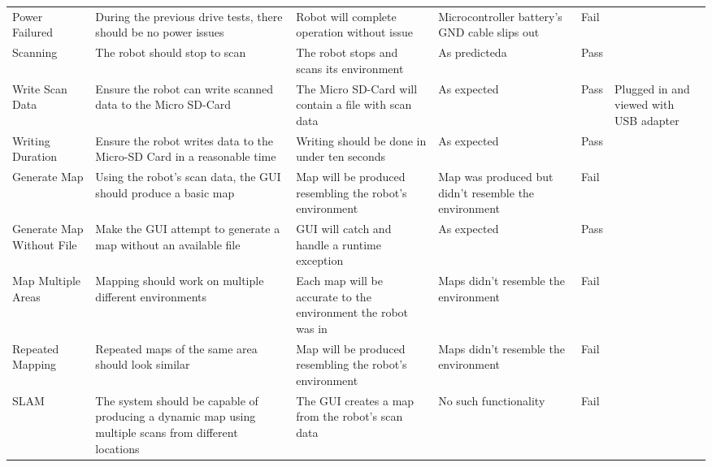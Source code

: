 \begin{appendices}
\begin{landscape}
\begin{longtable}{| p{2.5cm} | p{5cm} | p{4cm} | p{4cm} | p{1.5cm} | p{2cm} |}
						Power Failured & During the previous drive tests, there should be no power issues & Robot will complete operation without issue & Microcontroller battery's GND cable slips out & Fail &   \\
							
						Scanning & The robot should stop to scan & The robot stops and scans its environment & As predicteda & Pass &   \\ 
							
						Write Scan Data & Ensure the robot can write scanned data to the Micro SD-Card & The Micro SD-Card will contain a file with scan data & As expected & Pass & Plugged in and viewed with USB adapter  \\
							 
						Writing Duration & Ensure the robot writes data to the Micro-SD Card in a reasonable time  & Writing should be done in under ten seconds & As expected & Pass &   \\ 
							
						Generate Map & Using the robot's scan data, the GUI should produce a basic map & Map will be produced resembling the robot's environment & Map was produced but didn't resemble the environment & Fail &  \\ 
							
						Generate Map Without File & Make the GUI attempt to generate a map without an available file & GUI will catch and handle a runtime exception & As expected & Pass &  \\ 
							
						Map Multiple Areas & Mapping should work on multiple different environments & Each map will be accurate to the environment the robot was in & Maps didn't resemble the environment & Fail &  \\ 
							
						Repeated Mapping & Repeated maps of the same area should look similar & Map will be produced resembling the robot's environment & Maps didn't resemble the environment & Fail &  \\ 
							
						SLAM & The system should be capable of producing a dynamic map using multiple scans from different locations & The GUI creates a map from the robot's scan data & No such functionality & Fail &  \\ [1ex] 
							\hline
					\end{longtable}
			\end{landscape}			


\end{appendices}
